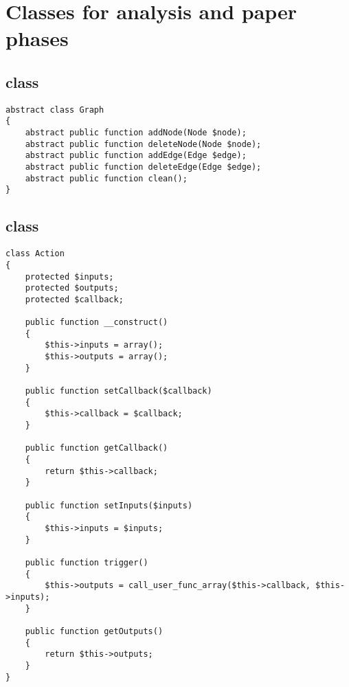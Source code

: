 \section{Classes for analysis and paper phases}%
\label{app:analysis}

\subsection{ class}%
\label{app:analysis:graph}

\begin{lstlisting}
abstract class Graph
{
    abstract public function addNode(Node $node);
    abstract public function deleteNode(Node $node);
    abstract public function addEdge(Edge $edge);
    abstract public function deleteEdge(Edge $edge);
    abstract public function clean();
}
\end{lstlisting}

\subsection{ class}%
\label{app:analysis:action}

\begin{lstlisting}
class Action
{
    protected $inputs;
    protected $outputs;
    protected $callback;

    public function __construct()
    {
        $this->inputs = array();
        $this->outputs = array();
    }

    public function setCallback($callback)
    {
        $this->callback = $callback;
    }

    public function getCallback()
    {
        return $this->callback;
    }

    public function setInputs($inputs)
    {
        $this->inputs = $inputs;
    }

    public function trigger()
    {
        $this->outputs = call_user_func_array($this->callback, $this->inputs);
    }

    public function getOutputs()
    {
        return $this->outputs;
    }
}
\end{lstlisting}

